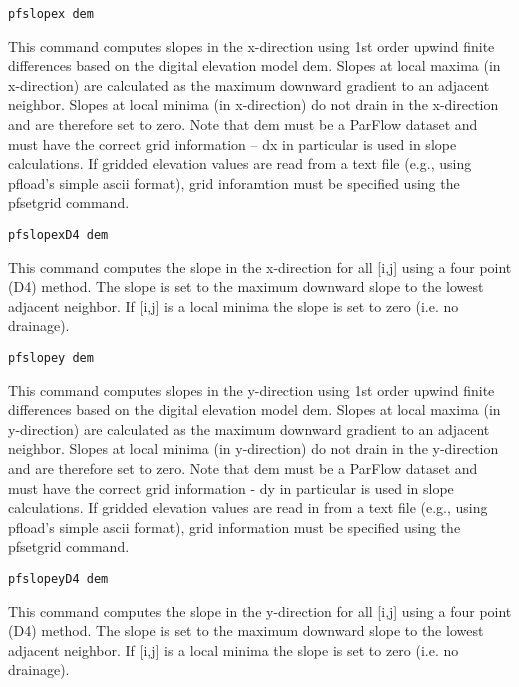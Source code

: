 \begin{description}
\item{\begin{verbatim}pfslopex dem\end{verbatim}}
This command computes slopes in the x-direction using 1st order upwind
finite differences based on the digital elevation model dem. Slopes at local 
maxima (in x-direction) are calculated as the maximum downward gradient to 
an adjacent neighbor. Slopes at local minima (in x-direction) do not drain in 
the x-direction and are therefore set to zero. Note that dem must be a 
ParFlow dataset and must have the correct grid information -- dx in particular
is used in slope calculations. If gridded elevation values are read from a text 
file (e.g., using pfload's simple ascii format), grid inforamtion must be 
specified using the pfsetgrid command. 

\item{\begin{verbatim}pfslopexD4 dem\end{verbatim}}
This command computes the slope in the x-direction for all [i,j] using a 
four point (D4) method. The slope is set to the maximum downward slope to the 
lowest adjacent neighbor. If [i,j] is a local minima the slope is set to zero (i.e. no drainage). 


\item{\begin{verbatim}pfslopey dem\end{verbatim}}
This command computes slopes in the y-direction using 1st order upwind 
finite differences based on the digital elevation model dem. Slopes at local 
maxima (in y-direction) are calculated as the maximum downward gradient to 
an adjacent neighbor. Slopes at local minima (in y-direction) do not drain in
the y-direction and are therefore set to zero. Note that dem must be a 
ParFlow dataset and must have the correct grid information - dy in particular 
is used in slope calculations. If gridded elevation values are read in from a 
text file (e.g., using pfload's simple ascii format), grid information must be
specified using the pfsetgrid command. 


\item{\begin{verbatim}pfslopeyD4 dem\end{verbatim}}
This command computes the slope in the y-direction for all [i,j] using a four point (D4) method. 
The slope is set to the maximum downward slope to the lowest adjacent neighbor. If [i,j] is a local 
minima the slope is set to zero (i.e. no drainage). 


\end{description}
